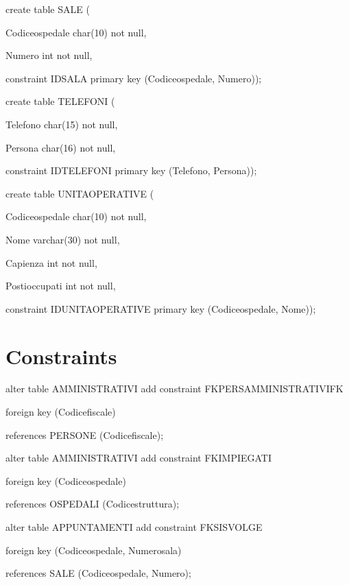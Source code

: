 \documentclass[a4paper,12pt]{report}
\begin{document}
\noindent create table SALE (

     Codice\textunderscore ospedale char(10) not null,
  
     Numero int not null,
  
     constraint IDSALA primary key (Codice\textunderscore ospedale, Numero)); \newline

\noindent create table TELEFONI (

     Telefono char(15) not null,
  
     Persona char(16) not null,
  
     constraint IDTELEFONI primary key (Telefono, Persona)); \newline

\noindent create table UNITA\textunderscore OPERATIVE (

     Codice\textunderscore ospedale char(10) not null,
  
     Nome varchar(30) not null,
  
     Capienza int not null,
  
     Posti\textunderscore occupati int not null,
  
     constraint IDUNITA\textunderscore OPERATIVE primary key (Codice\textunderscore ospedale, Nome)); \newline

\section{Constraints}

\noindent alter table AMMINISTRATIVI add constraint FKPERS\textunderscore AMMINISTRATIVI\textunderscore FK

     foreign key (Codice\textunderscore fiscale)

     references PERSONE (Codice\textunderscore fiscale); \newline

\noindent alter table AMMINISTRATIVI add constraint FKIMPIEGATI

     foreign key (Codice\textunderscore ospedale)

     references OSPEDALI (Codice\textunderscore struttura); \newline

\noindent alter table APPUNTAMENTI add constraint FKSI\textunderscore SVOLGE

     foreign key (Codice\textunderscore ospedale, Numero\textunderscore sala)

     references SALE (Codice\textunderscore ospedale, Numero); \newline
\end{document}
